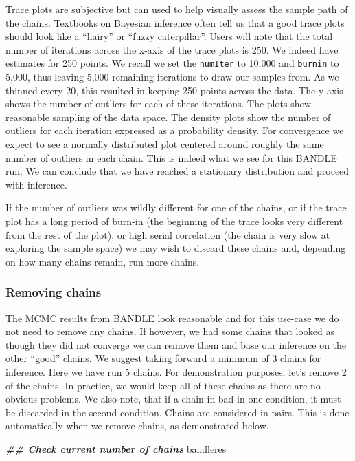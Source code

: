 \documentclass[9pt,a4paper,]{extarticle}
\newenvironment{Shaded}{\begin{snugshade}}{\end{snugshade}}
\newcommand{\DocumentationTok}[1]{\textcolor[rgb]{0.56,0.35,0.01}{\textbf{\textit{#1}}}}
\newcommand{\NormalTok}[1]{#1}
\begin{document}
Trace plots are subjective but can used to help visually assess the sample path
of the chains. Textbooks on Bayesian inference often tell us that a good trace
plots should look like a ``hairy'' or ``fuzzy caterpillar''. Users will note that
the total number of iterations across the x-axis of the trace plots is 250. We
indeed have estimates for 250 points. We recall we set the \texttt{numIter} to 10,000
and \texttt{burnin} to 5,000, thus leaving 5,000 remaining iterations to draw our
samples from. As we thinned every 20, this resulted in keeping 250 points across
the data. The y-axis shows the number of outliers for each of these iterations.
The plots show reasonable sampling of the data space. The density plots show the
number of outliers for each iteration expressed as a probability density. For
convergence we expect to see a normally distributed plot centered around roughly
the same number of outliers in each chain. This is indeed what we see for this
BANDLE run. We can conclude that we have reached a stationary distribution and
proceed with inference.

If the number of outliers was wildly different for one of the chains, or if
the trace plot has a long period of burn-in (the beginning of the trace looks
very different from the rest of the plot), or high serial correlation (the chain
is very slow at exploring the sample space) we may wish to discard these chains
and, depending on how many chains remain, run more chains.

\subsubsection{Removing chains}\label{removing-chains}

The MCMC results from BANDLE look reasonable and for this use-case we do not
need to remove any chains. If however, we had some chains that looked as though they
did not converge we can remove them and base our inference on the other ``good''
chains. We suggest taking forward a minimum of 3 chains for inference. Here
we have run 5 chains. For demonstration purposes, let's remove 2 of the chains. In
practice, we would keep all of these chains as there are no obvious problems. We
also note, that if a chain in bad in one condition, it must be discarded in the
second condition. Chains are considered in pairs. This is done automatically
when we remove chains, as demonstrated below.

\begin{Shaded}
\begin{Highlighting}[]
\DocumentationTok{\#\# Check current number of chains}
\NormalTok{bandleres}
\end{Highlighting}
\end{Shaded}
\end{document}
